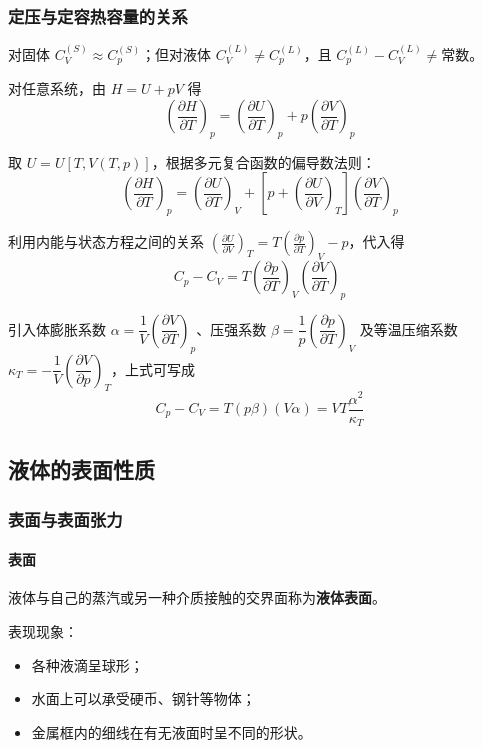 \documentclass[UTF8]{ctexart}
\begin{document}
\subsubsection{定压与定容热容量的关系}

对固体 $C_V^{(S)}\approx C_p^{(S)}$；但对液体 $C_V^{(L)}\neq C_p^{(L)}$，且 $C_p^{(L)}-C_V^{(L)}\neq\text{常数}$。

对任意系统，由 $H=U+pV$ 得
\[
\left(\frac{\partial H}{\partial T}\right)_p=\left(\frac{\partial U}{\partial T}\right)_p+p\left(\frac{\partial V}{\partial T}\right)_p
\]

取 $U=U[T,V(T,p)]$，根据多元复合函数的偏导数法则：
\[
\left(\frac{\partial H}{\partial T}\right)_p=\left(\frac{\partial U}{\partial T}\right)_V+\left[p+\left(\frac{\partial U}{\partial V}\right)_T\right]\left(\frac{\partial V}{\partial T}\right)_p
\]

利用内能与状态方程之间的关系 $\displaystyle\left(\frac{\partial U}{\partial V}\right)_T=T\left(\frac{\partial p}{\partial T}\right)_V-p$，代入得
\[
\boxed{C_p-C_V=T\left(\frac{\partial p}{\partial T}\right)_V\left(\frac{\partial V}{\partial T}\right)_p}
\]

引入体膨胀系数 $\alpha=\dfrac{1}{V}\left(\dfrac{\partial V}{\partial T}\right)_p$、压强系数 $\beta=\dfrac{1}{p}\left(\dfrac{\partial p}{\partial T}\right)_V$ 及等温压缩系数 $\kappa_T=-\dfrac{1}{V}\left(\dfrac{\partial V}{\partial p}\right)_T$，上式可写成
\[
C_p-C_V=T(p\beta)(V\alpha)=VT\frac{\alpha^2}{\kappa_T}
\]

\subsection{液体的表面性质}

\subsubsection{表面与表面张力}

\paragraph{表面}
液体与自己的蒸汽或另一种介质接触的交界面称为\textbf{液体表面}。

表现现象：
\begin{itemize}[leftmargin=2em]
  \item 各种液滴呈球形；
  \item 水面上可以承受硬币、钢针等物体；
  \item 金属框内的细线在有无液面时呈不同的形状。
\end{itemize}
\end{document}
